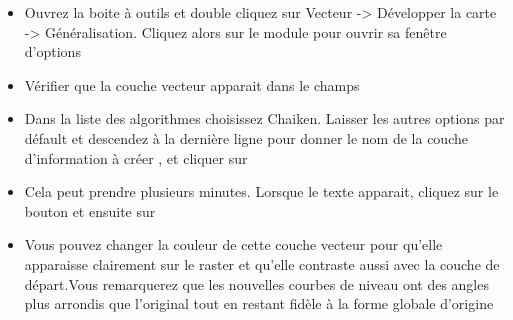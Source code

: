 {\begin{itemize}[label=--]
\item Ouvrez la boite à outils \grass et double cliquez sur Vecteur -> Développer la carte -> Généralisation. Cliquez alors sur le module  pour ouvrir sa fenêtre d'options
\item Vérifier que la couche vecteur  apparait dans le champs\\ 
\item Dans la liste des algorithmes choisissez Chaiken. Laisser les autres options par défault et descendez à la dernière ligne pour donner le nom de la couche d'information à créer  , et cliquer sur 
\item Cela peut prendre plusieurs minutes. Lorsque le texte  apparait, cliquez sur le bouton  et ensuite sur 
\item Vous pouvez changer la couleur de cette couche vecteur pour qu'elle apparaisse clairement sur le raster et qu'elle contraste aussi avec la couche de départ.Vous remarquerez que les nouvelles courbes de niveau ont des angles plus arrondis que l'original tout en restant fidèle à la forme globale d'origine
\end{itemize}

}
